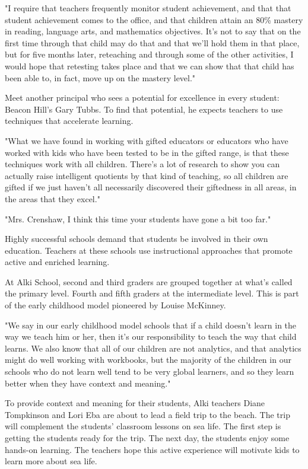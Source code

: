 "I require that teachers frequently monitor student achievement, and that that student achievement comes to the office, and that children attain an 80\% mastery in reading, language arts, and mathematics objectives. It's not to say that on the first time through that child may do that and that we'll hold them in that place, but for five months later, reteaching and through some of the other activities, I would hope that retesting takes place and that we can show that that child has been able to, in fact, move up on the mastery level."

Meet another principal who sees a potential for excellence in every student: Beacon Hill's Gary Tubbs. To find that potential, he expects teachers to use techniques that accelerate learning.

"What we have found in working with gifted educators or educators who have worked with kids who have been tested to be in the gifted range, is that these techniques work with all children. There's a lot of research to show you can actually raise intelligent quotients by that kind of teaching, so all children are gifted if we just haven't all necessarily discovered their giftedness in all areas, in the areas that they excel."

"Mrs. Crenshaw, I think this time your students have gone a bit too far."

Highly successful schools demand that students be involved in their own education. Teachers at these schools use instructional approaches that promote active and enriched learning.

At Alki School, second and third graders are grouped together at what's called the primary level. Fourth and fifth graders at the intermediate level. This is part of the early childhood model pioneered by Louise McKinney.

"We say in our early childhood model schools that if a child doesn't learn in the way we teach him or her, then it's our responsibility to teach the way that child learns. We also know that all of our children are not analytics, and that analytics might do well working with workbooks, but the majority of the children in our schools who do not learn well tend to be very global learners, and so they learn better when they have context and meaning."

To provide context and meaning for their students, Alki teachers Diane Tompkinson and Lori Eba are about to lead a field trip to the beach. The trip will complement the students' classroom lessons on sea life. The first step is getting the students ready for the trip. The next day, the students enjoy some hands-on learning. The teachers hope this active experience will motivate kids to learn more about sea life.


